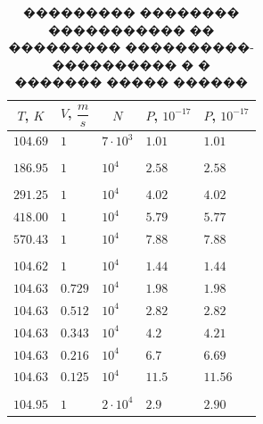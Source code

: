\begin{table}[h!]
    \centering
    \label{Table 1}
    \begin{tabular}{|l|l|l|l|l|}
        \hline
        \multicolumn{1}{|c|}{$T$, $K$} & \multicolumn{1}{c|}{$V$, $\dfrac{m}{s}$} & \multicolumn{1}{c|}{$N$} & \multicolumn{1}{c|}{$P$, $10^{-17}$} & \multicolumn{1}{c|}{$P$, $10^{-17}$} \\ \hline
        $104.69$ & $1$ & $7\cdot 10^3$ & $1.01$ & $1.01$                                    \\
        & & & &                                         \\
        $186.95$ & $1$ & $10^4$ & $2.58$ & $2.58$                                    \\
        & & & &                                         \\
        $291.25$ & $1$ & $10^4$ & $4.02$ & $4.02$                                    \\
        $418.00$ & $1$ & $10^4$ & $5.79$ & $5.77$                                    \\
        $570.43$ & $1$ & $10^4$ & $7.88$ & $7.88$                                    \\
        & & & &                                         \\
        $104.62$ & $1$ & $10^4$ & $1.44$ & $1.44$                                  \\
        $104.63$ & $0.729$ & $10^4$ & $1.98$ & $1.98$                                    \\
        $104.63$ & $0.512$ & $10^4$ & $2.82$ & $2.82$                                    \\
        $104.63$ & $0.343$ & $10^4$ & $4.2$ & $4.21$                                    \\
        $104.63$ & $0.216$ & $10^4$ & $6.7$ & $6.69$                                    \\
        $104.63$ & $0.125$ & $10^4$ & $11.5$ & $11.56$                                   \\
        & & & &                                         \\
        $104.95$ & $1$ & $2 \cdot 10^4$ & $2.9$ & $2.90$                                    \\ \hline
    \end{tabular}
    \caption{��������� �������� ����������� �� ��������� ����������-���������� � � ������� ����� ������}
\end{table}

